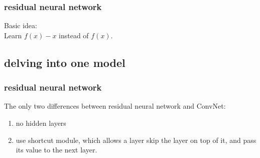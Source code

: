 \documentclass{beamer}
\begin{document}
\begin{frame}
\frametitle{residual neural network}
Basic idea:\\
Learn $f(x)-x$ instead of $f(x)$.
\end{frame}
\subsection{delving into one model}


\begin{frame}
\frametitle{residual neural network}
The only two differences between residual neural network and ConvNet:
\begin{enumerate}
\item no hidden layers
\item use shortcut module, which allows a layer skip the layer on top of it,
 and pass its value to the next layer.
\end{enumerate}
\end{frame}
\end{document}
